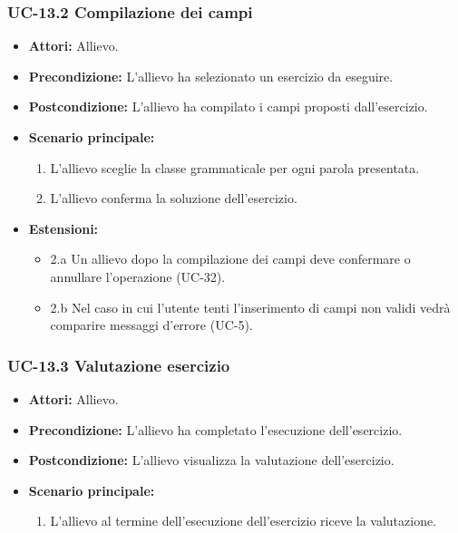 	\subsubsection{UC-13.2 Compilazione dei campi}
		\begin{itemize}
			\item \textbf{Attori:} Allievo.
			\item \textbf{Precondizione:} L'allievo ha selezionato un esercizio da eseguire.
			\item \textbf{Postcondizione:} L'allievo ha compilato i campi proposti dall'esercizio.
			\item \textbf{Scenario principale:}
				\begin{enumerate}
					\item L'allievo sceglie la classe grammaticale per ogni parola presentata.
					\item L'allievo conferma la soluzione dell'esercizio.
				\end{enumerate}
			\item \textbf{Estensioni:} 
				\begin{itemize}
					\item 2.a Un allievo dopo la compilazione dei campi deve confermare o annullare l'operazione (UC-32).
					\item 2.b Nel caso in cui l'utente tenti l'inserimento di campi non validi vedrà comparire messaggi d'errore (UC-5).
				\end{itemize}
		\end{itemize}

	\subsubsection{UC-13.3 Valutazione esercizio}
	\begin{itemize}
			\item \textbf{Attori:} Allievo.
			\item \textbf{Precondizione:} L'allievo ha completato l'esecuzione dell'esercizio.
			\item \textbf{Postcondizione:} L'allievo visualizza la valutazione dell'esercizio.
			\item \textbf{Scenario principale:}
				\begin{enumerate}
					\item L'allievo al termine dell'esecuzione dell'esercizio riceve la valutazione.
				\end{enumerate}
			\end{itemize}
			
